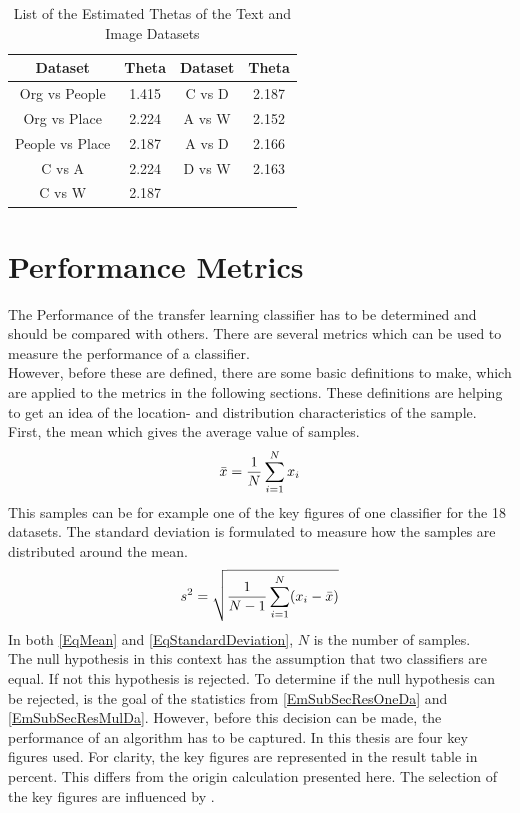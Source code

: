 \begin{table}[]
	\centering
		\begin{tabular}{|c|c||c|c|}
			\hline
			Dataset         & Theta & Dataset & Theta \\ \hline
			Org vs People   & 1.415 & C vs D  & 2.187 \\ \hline
			Org vs Place    & 2.224 & A vs W  & 2.152\\ \hline
			People vs Place & 2.187 & A vs D  & 2.166\\ \hline
			C vs A          & 2.224 & D vs W  & 2.163 \\ \hline
			C vs W          & 2.187 
	\end{tabular}
	\caption{List of the Estimated Thetas of the Text and Image Datasets\label{TableThetaEst}}
\end{table}

\section{Performance Metrics}\label{EmSubSecPerMet}
The Performance of the transfer learning classifier has to be determined and should be compared with others.
There are several metrics which can be used to measure the performance of a classifier.\\
However, before these are defined, there are some basic definitions to make, which are applied to the metrics in the following sections.
These definitions are helping to get an idea of the location- and distribution characteristics of the sample.\cite[p. 216-217]{Teschl.2014}
First, the mean which gives the average value of samples. 
\begin{equation}\label{EqMean}
	\bar{x} = \frac{1}{N}\sum_{i=1}^{N}x_i
\end{equation}
This samples can be for example one of the key figures of one classifier for the 18 datasets. 
The standard deviation is formulated to measure how the samples are distributed around the mean.
\begin{equation}\label{EqStandardDeviation}
s^2=\sqrt{\frac{1}{N-1}\sum_{i=1}^{N}(x_i-\bar{x})}
\end{equation}
In both \eqref{EqMean} and \eqref{EqStandardDeviation}, $N$ is the number of samples. \\
The null hypothesis in this context has the assumption that two classifiers are equal.
If not this hypothesis is rejected.\cite{Alpaydm.1999} 
To determine if the null hypothesis can be rejected, is the goal of the statistics from \ref{EmSubSecResOneDa} and \ref{EmSubSecResMulDa}.
However, before this decision can be made, the performance of an algorithm has to be captured.
In this thesis are four key figures used.
For clarity, the key figures are represented in the result table in percent.
This differs from the origin calculation presented here.
The selection of the key figures are influenced by \cite{Chen.2009}.\\
